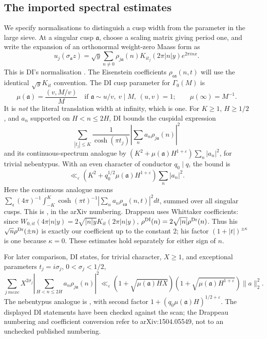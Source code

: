 \subsection*{The imported spectral estimates}
We specify normalisations to distinguish a cusp width from the parameter
in the large sieve. At a singular cusp \(\mathfrak a\), choose a scaling
matrix giving period one, and write the expansion of an orthonormal
weight-zero Maass form as
\begin{equation}\label{B:eq:fourier}
 u_j(\sigma_{\mathfrak a}z)
 =\sqrt y\sum_{n\ne0}\rho_{j\mathfrak a}(n)
                 K_{it_j}(2\pi|n|y)e^{2\pi inx}.
\end{equation}
This is DI's normalisation \cite[(1.34), p.~231]{DI}.
The Eisenstein coefficients \(\rho_{\mathfrak c\mathfrak a}(n,t)\)
will use the identical \(\sqrt yK_{it}\) convention. The DI cusp
parameter for \(\Gamma_0(M)\) is
\[
 \mu(\mathfrak a)=\frac{(v,M/v)}M
 \quad\text{if }\mathfrak a\sim u/v,\ v\mid M,\ (u,v)=1;
 \qquad \mu(\infty)=M^{-1}.
\]
It is \emph{not} the literal translation width at infinity, which is one.
For \(K\ge1\), \(H\ge1/2\), and \(a_n\) supported on \(H<n\le2H\),
DI \cite[Theorem 2, (1.29)--(1.30), p.~230]{DI} bounds the cuspidal
expression
\[
 \sum_{|t_j|\le K}\frac1{\cosh(\pi t_j)}
       \left|\sum_n a_n\rho_{j\mathfrak a}(n)\right|^2
\]
and its continuous-spectrum analogue by
\((K^2+\mu(\mathfrak a)H^{1+\varepsilon})\sum_n|a_n|^2\), for trivial
nebentypus. With an even character of conductor \(q_0\mid q\), the bound is
\begin{equation}\label{B:eq:large-sieve}
 \ll_\varepsilon
 (K^2+q_0^{1/2}\mu(\mathfrak a)H^{1+\varepsilon})\sum_n|a_n|^2.
\end{equation}
Here the continuous analogue means
\(\sum_{\mathfrak c}(4\pi)^{-1}\int_{-K}^K
\cosh(\pi t)^{-1}|\sum_n a_n\rho_{\mathfrak c\mathfrak a}(n,t)|^2dt\),
summed over all singular cusps. This is
\cite[Proposition 4.7, (4.24)--(4.25)]{Dr}, in the arXiv numbering.
Drappeau uses Whittaker coefficients: since
\(W_{0,it}(4\pi|n|y)=2\sqrt{|n|y}K_{it}(2\pi|n|y)\),
\(\rho^{\rm DI}(n)=2\sqrt{|n|}\rho^{\rm Dr}(n)\).
Thus his \(\sqrt n\rho^{\rm Dr}(\pm n)\) is exactly our coefficient
up to the constant 2; his factor \((1+|t|)^{\pm\kappa}\) is one because
\(\kappa=0\). These estimates hold separately for either sign of \(n\).

For later comparison, DI \cite[Theorem 5, (1.38), p.~232]{DI} states,
for trivial character, \(X\ge1\), and exceptional parameters
\(t_j=i\sigma_j\), \(0<\sigma_j<1/2\),
\begin{equation}\label{B:eq:exceptional-sieve}
 \sum_{j\ {
m exc}}X^{2\sigma_j}
   \left|\sum_{H<n\le2H}a_n\rho_{j\mathfrak a}(n)\right|^2
 \ll_\varepsilon
 (1+\sqrt{\mu(\mathfrak a)HX})
 (1+\sqrt{\mu(\mathfrak a)H^{1+\varepsilon}})\|a\|_2^2.
\end{equation}
The nebentypus analogue is \cite[Lemma 4.8]{Dr}, with second factor
\(1+(q_0\mu(\mathfrak a)H)^{1/2+\varepsilon}\).
The displayed DI statements have been checked against the scan; the
Drappeau numbering and coefficient conversion refer to arXiv:1504.05549,
not to an unchecked published numbering.

